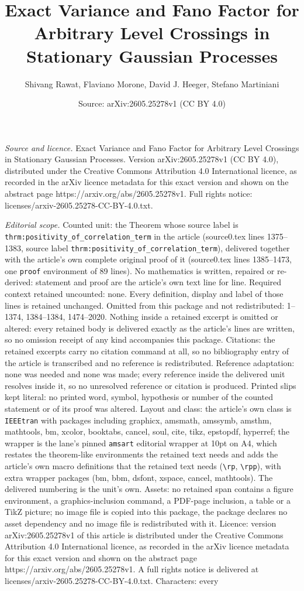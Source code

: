 \documentclass[10pt,a4paper]{amsart}
\title[Exact Variance and Fano Factor for Arbitrary Level Crossings]{Exact Variance and Fano Factor for Arbitrary Level Crossings in Stationary Gaussian Processes}
\author{Shivang Rawat, Flaviano Morone, David J. Heeger, Stefano Martiniani}
\date{Source: arXiv:2605.25278v1 (CC BY 4.0)}
\begin{document}
\maketitle

\noindent\emph{Source and licence.} Exact Variance and Fano Factor for Arbitrary Level Crossings in Stationary Gaussian Processes. Version arXiv:2605.25278v1 (CC BY 4.0), distributed under the Creative Commons Attribution 4.0 International licence, as recorded in the arXiv licence metadata for this exact version and shown on the abstract page https://arxiv.org/abs/2605.25278v1. Full rights notice: licenses/arxiv-2605.25278-CC-BY-4.0.txt.\par\smallskip

\noindent\textit{Editorial scope.} Counted unit: the Theorem whose source label is \texttt{thrm:positivity\_of\_correlation\_term} in the article (source0.tex lines 1375--1383, source label \texttt{thrm:positivity\_of\_correlation\_term}), delivered together with the article's own complete original proof of it (source0.tex lines 1385--1473, one \texttt{proof} environment of 89 lines). No mathematics is written, repaired or re-derived: statement and proof are the article's own text line for line. Required context retained uncounted: none. Every definition, display and label of those lines is retained unchanged. Omitted from this package and not redistributed: 1--1374, 1384--1384, 1474--2020. Nothing inside a retained excerpt is omitted or altered: every retained body is delivered exactly as the article's lines are written, so no omission receipt of any kind accompanies this package. Citations: the retained excerpts carry no citation command at all, so no bibliography entry of the article is transcribed and no reference is redistributed. Reference adaptation: none was needed and none was made; every reference inside the delivered unit resolves inside it, so no unresolved reference or citation is produced. Printed slips kept literal: no printed word, symbol, hypothesis or number of the counted statement or of its proof was altered. Layout and class: the article's own class is \texttt{IEEEtran} with packages including graphicx, amsmath, amssymb, amsthm, mathtools, bm, xcolor, booktabs, cancel, soul, cite, tikz, epstopdf, hyperref; the wrapper is the lane's pinned \texttt{amsart} editorial wrapper at 10pt on A4, which restates the theorem-like environments the retained text needs and adds the article's own macro definitions that the retained text needs (\texttt{\textbackslash rp}, \texttt{\textbackslash rpp}), with extra wrapper packages (bm, bbm, dsfont, xspace, cancel, mathtools). The delivered numbering is the unit's own. Assets: no retained span contains a figure environment, a graphics-inclusion command, a PDF-page inclusion, a table or a TikZ picture; no image file is copied into this package, the package declares no asset dependency and no image file is redistributed with it. Licence: version arXiv:2605.25278v1 of this article is distributed under the Creative Commons Attribution 4.0 International licence, as recorded in the arXiv licence metadata for this exact version and shown on the abstract page https://arxiv.org/abs/2605.25278v1. A full rights notice is delivered at licenses/arxiv-2605.25278-CC-BY-4.0.txt. Characters: every 
\end{document}
